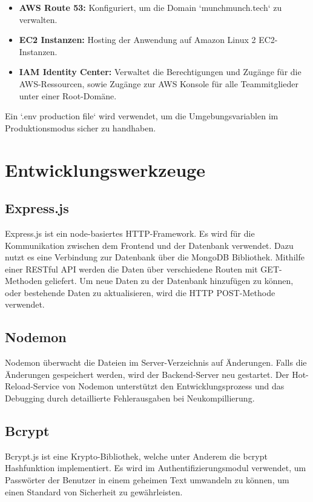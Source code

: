 \documentclass[conference,a4paper,flushend]{cs-techrep}
\begin{document}
\begin{itemize}
  \item \textbf{AWS Route 53:} Konfiguriert, um die Domain `munchmunch.tech` zu verwalten.
  \item \textbf{EC2 Instanzen:} Hosting der Anwendung auf Amazon Linux 2 EC2-Instanzen.
  \item \textbf{IAM Identity Center:} Verwaltet die Berechtigungen und Zugänge für die AWS-Ressourcen, sowie Zugänge zur AWS Konsole für alle Teammitglieder unter einer Root-Domäne.
\end{itemize}

Ein `.env production file` wird verwendet, um die Umgebungsvariablen im Produktionsmodus sicher zu handhaben.

\section{Entwicklungswerkzeuge}
\subsection{Express.js}
Express.js ist ein node-basiertes HTTP-Framework. Es wird für die Kommunikation zwischen dem Frontend und der Datenbank verwendet. Dazu nutzt es eine Verbindung zur Datenbank über die MongoDB Bibliothek. Mithilfe einer RESTful API werden die Daten über verschiedene Routen mit GET-Methoden geliefert. Um neue Daten zu der Datenbank hinzufügen zu können, oder bestehende Daten zu aktualisieren, wird die HTTP POST-Methode verwendet.

\subsection{Nodemon}
Nodemon überwacht die Dateien im Server-Verzeichnis auf Änderungen. Falls die Änderungen gespeichert werden, wird der Backend-Server neu gestartet. Der Hot-Reload-Service von Nodemon unterstützt den Entwicklungsprozess und das Debugging durch detaillierte Fehlerausgaben bei Neukompillierung. 

\subsection{Bcrypt}
Bcrypt.js ist eine Krypto-Bibliothek, welche unter Anderem die bcrypt Hashfunktion implementiert. Es wird im Authentifizierungsmodul verwendet, um Passwörter der Benutzer in einem geheimen Text umwandeln zu können, um einen Standard von Sicherheit zu gewährleisten.
\end{document}
